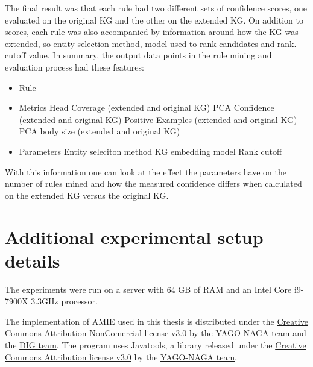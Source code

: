 The final result was that each rule had two different sets of confidence scores, one evaluated on the original KG and the other on the extended KG. On addition to scores, each rule was also accompanied by information around how the KG was extended, so entity selection method, model used to rank candidates and rank. cutoff value. In summary, the output data points in the rule mining and evaluation process had these features:
\begin{itemize}
    \item Rule
    \item Metrics
        \subitem Head Coverage (extended and original KG)
        \subitem PCA Confidence (extended and original KG)
        \subitem Positive Examples (extended and original KG)
        \subitem PCA body size (extended and original KG)
    \item Parameters
        \subitem Entity seleciton method
        \subitem KG embedding model
        \subitem Rank cutoff
\end{itemize}

With this information one can look at the effect the parameters have on the number of rules mined and how the measured confidence differs when calculated on the extended KG versus the original KG.


\section{Additional experimental setup details}
The experiments were run on a server with 64 GB of RAM and an Intel Core i9-7900X 3.3GHz processor.

The implementation of AMIE used in this thesis is distributed under the \hyperlink{https://creativecommons.org/licenses/by-nc/3.0/}{Creative Commons Attribution-NonComercial license v3.0} by the \hyperlink{https://www.mpi-inf.mpg.de/departments/databases-and-information-systems/research/yago-naga/amie/}{YAGO-NAGA team} and the \hyperlink{https://dig.telecom-paris.fr/blog/}{DIG team}. The program uses Javatools, a library released under the \hyperlink{https://creativecommons.org/licenses/by/3.0/}{Creative Commons Attribution license v3.0} by the \hyperlink{https://www.mpi-inf.mpg.de/departments/databases-and-information-systems/research/yago-naga/amie/}{YAGO-NAGA team}.
